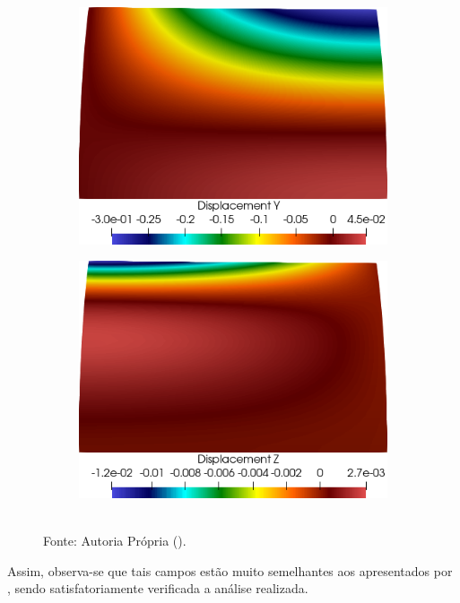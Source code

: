 \begin{figure}[h!]
\begin{subfigure}{0.31\textwidth}
    \end{subfigure}
    \begin{subfigure}{0.31\textwidth}
        \includegraphics[width=\linewidth]{Figuras/scordelis/uy.png}
    \end{subfigure}
    \begin{subfigure}{0.31\textwidth}
        \includegraphics[width=\linewidth]{Figuras/scordelis/uz.png}
    \end{subfigure}
    \\Fonte: Autoria Própria (\the\year).
    \label{fig:scordelis-displ}
\end{figure}

Assim, observa-se que tais campos estão muito semelhantes aos apresentados por , sendo satisfatoriamente verificada a análise realizada.

